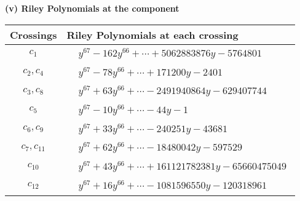 \documentclass[1p]{elsarticle_modified}
\theoremstyle{definition}
\begin{document}
\newpage\renewcommand{\arraystretch}{1}
\flushleft \textbf{(v) Riley Polynomials at the component}\newline \\
\begin{tabular}{m{50pt}|m{274pt}}
Crossings & \hspace{64pt}Riley Polynomials at each crossing \\
\hline $$\begin{aligned}c_{1}\end{aligned}$$&$\begin{aligned}
&y^{67}-162 y^{66}+\cdots+5062883876 y-5764801
\end{aligned}$\\
\hline $$\begin{aligned}c_{2},c_{4}\end{aligned}$$&$\begin{aligned}
&y^{67}-78 y^{66}+\cdots+171200 y-2401
\end{aligned}$\\
\hline $$\begin{aligned}c_{3},c_{8}\end{aligned}$$&$\begin{aligned}
&y^{67}+63 y^{66}+\cdots-2491940864 y-629407744
\end{aligned}$\\
\hline $$\begin{aligned}c_{5}\end{aligned}$$&$\begin{aligned}
&y^{67}-10 y^{66}+\cdots-44 y-1
\end{aligned}$\\
\hline $$\begin{aligned}c_{6},c_{9}\end{aligned}$$&$\begin{aligned}
&y^{67}+33 y^{66}+\cdots-240251 y-43681
\end{aligned}$\\
\hline $$\begin{aligned}c_{7},c_{11}\end{aligned}$$&$\begin{aligned}
&y^{67}+62 y^{66}+\cdots-18480042 y-597529
\end{aligned}$\\
\hline $$\begin{aligned}c_{10}\end{aligned}$$&$\begin{aligned}
&y^{67}+43 y^{66}+\cdots+161121782381 y-65660475049
\end{aligned}$\\
\hline $$\begin{aligned}c_{12}\end{aligned}$$&$\begin{aligned}
&y^{67}+16 y^{66}+\cdots-1081596550 y-120318961
\end{aligned}$\\
\hline
\end{tabular}\\~\\
\end{document}
